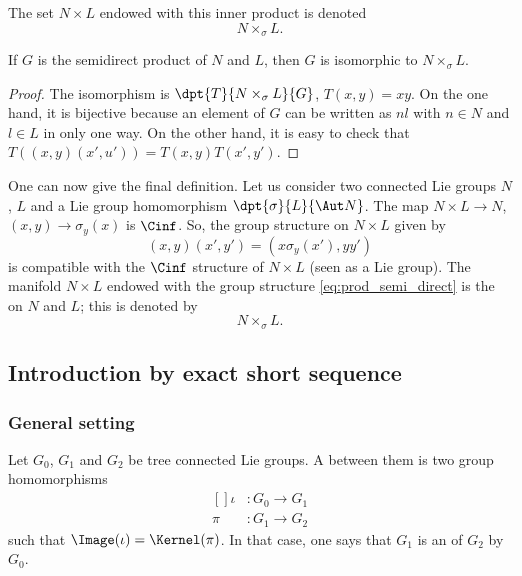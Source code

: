 The set $N\times L$ endowed with this inner product is denoted
\[
   N\times_{\sigma}L.
\]

\begin{proposition}
If $G$ is the semidirect product of $N$ and $L$, then $G$ is isomorphic to $N\times_{\sigma} L$.
\end{proposition}

\begin{proof}
    The isomorphism is $\dpt{T}{N\times_{\sigma}L}{G}$, $T(x,y)=xy$. On the one hand, it is bijective because an element of $G$ can be written as $nl$ with $n\in N$ and $l\in L$ in only one way. On the other hand, it is easy to check that $T( (x,y)(x',u') )=T(x,y)T(x',y')$.
\end{proof}

One can now give the final definition. Let us consider two connected Lie groups $N$, $L$ and a Lie group  homomorphism $\dpt{\sigma}{L}{\Aut N}$. The map $N\times L\to N$, $(x,y)\to\sigma_y(x)$ is $\Cinf$. So, the group structure on $N\times L$ given by
\begin{equation}\label{eq:prod_semi_direct}
   (x,y)(x',y')=(x\sigma_y(x'),yy')
\end{equation}
is compatible with the $\Cinf$ structure of $N\times L$ (seen as a Lie group). The manifold $N\times L$ endowed with the group structure \eqref{eq:prod_semi_direct} is the  on $N$ and $L$; this is denoted by
\[
   N\times_{\sigma}L.
\]

\subsection{Introduction by exact short sequence}

\subsubsection{General setting}

Let $G_0$, $G_1$ and $G_2$ be tree connected Lie groups. A  between them is two group homomorphisms
\begin{equation}
    \begin{aligned}[]
        \iota&\colon G_0\to G_1\\
        \pi&\colon G_1\to G_2
    \end{aligned}
\end{equation}
such that $\Image(\iota)=\Kernel(\pi)$. In that case, one says that $G_1$ is an  of $G_2$ by $G_0$.

